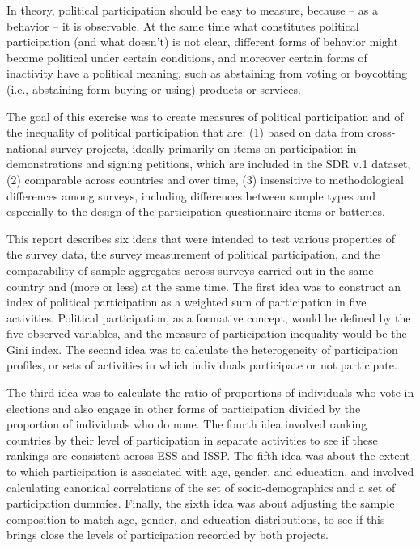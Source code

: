 \documentclass[12pt,]{article}
\begin{document}
In theory, political participation should be easy to measure, because -- as a behavior -- it is observable. At the same time what constitutes political participation (and what doesn't) is not clear, different forms of behavior might become political under certain conditions, and moreover certain forms of inactivity have a political meaning, such as abstaining from voting or boycotting (i.e., abstaining form buying or using) products or services.

The goal of this exercise was to create measures of political participation and of the inequality of political participation that are: (1) based on data from cross-national survey projects, ideally primarily on items on participation in demonstrations and signing petitions, which are included in the SDR v.1 dataset, (2) comparable across countries and over time, (3) insensitive to methodological differences among surveys, including differences between sample types and especially to the design of the participation questionnaire items or batteries.

This report describes six ideas that were intended to test various properties of the survey data, the survey measurement of political participation, and the comparability of sample aggregates across surveys carried out in the same country and (more or less) at the same time. The first idea was to construct an index of political participation as a weighted sum of participation in five activities. Political participation, as a formative concept, would be defined by the five observed variables, and the measure of participation inequality would be the Gini index. The second idea was to calculate the heterogeneity of participation profiles, or sets of activities in which individuals participate or not participate.

The third idea was to calculate the ratio of proportions of individuals who vote in elections and also engage in other forms of participation divided by the proportion of individuals who do none. The fourth idea involved ranking countries by their level of participation in separate activities to see if these rankings are consistent across ESS and ISSP. The fifth idea was about the extent to which participation is associated with age, gender, and education, and involved calculating canonical correlations of the set of socio-demographics and a set of participation dummies. Finally, the sixth idea was about adjusting the sample composition to match age, gender, and education distributions, to see if this brings close the levels of participation recorded by both projects.
\end{document}
